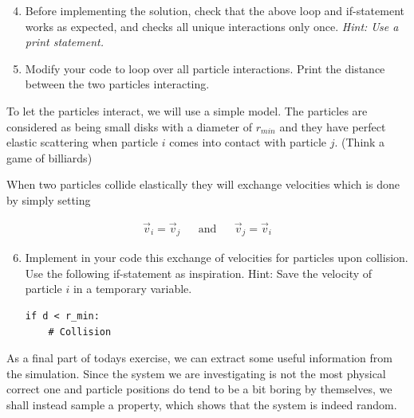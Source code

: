 \documentclass{article}
\begin{document}
\begin{enumerate}
  \setcounter{enumi}{3}
  \item Before implementing the solution, check that the above loop and
    if-statement works as expected, and checks all unique interactions only once. {\em Hint: Use
    a print statement.}

  \item Modify your code to loop over all particle interactions. Print the
    distance between the two particles interacting.

\end{enumerate}

To let the particles interact, we will use a simple model. The
particles are considered as being small disks with a diameter of $r_{min}$ and they have
perfect elastic scattering when particle $i$ comes into contact with particle $j$.
(Think a game of billiards)


When two particles collide elastically they will exchange velocities which is done by simply setting

\begin{align}
  \vec{v}_i = \vec{v}_j & & \text{and} & & \vec{v}_j = \vec{v}_i
\end{align}


\begin{enumerate}
  \setcounter{enumi}{5}
  \item Implement in your code this exchange of velocities for particles upon
    collision. Use the following if-statement as inspiration.
    {Hint:} Save the velocity of particle $i$ in a temporary variable.

\begin{lstlisting}
if d < r_min:
    # Collision
\end{lstlisting}

\end{enumerate}

As a final part of todays exercise, we can extract some useful information from the simulation.
Since the system we are investigating is not the most physical correct one and
particle positions do tend to be a bit boring by themselves, we shall instead
sample a property, which shows that the system is indeed random.
\end{document}
